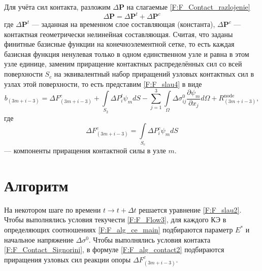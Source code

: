 \documentclass[]{article}
\begin{document}
Для учёта сил контакта, разложим $\Delta\mathbf{P}$ на слагаемые \eqref{F:F_Contact_razlojenie}
\begin{equation}
\Delta\mathbf{P}=\Delta\mathbf{P}^{t}+\Delta\mathbf{P}^{c}
\label{F:F_alg_contact1}
\end{equation}
где $\Delta\mathbf{P}^{t}$ --- заданная на временном слое составляющая (константа), $\Delta \mathbf{P}^{c}$ --- контактная геометрически нелинейная составляющая. Считая, что заданы финитные базисные функции на конечноэлементной сетке, то есть каждая базисная функция ненулевая только в одном единственном узле и равна в этом узле единице, заменим приращение контактных распределённых сил со всей поверхности $S_c$ на эквивалентный набор приращений узловых контактных сил в узлах этой поверхности, то есть представим \eqref{F:F_slau4} в виде
\begin{equation}
b_{(3m+i-3)}=\Delta F_{(3m+i-3)}^{c}+\int\limits_{S_{2}}\Delta P_{i}^{t}\psi_{m} dS - \sum_{j=1}^{3}\int\limits_{\Omega}\Delta\sigma_{ij}^{0}\frac{\partial\psi_{m}}{\partial x_j}d\Omega+R_{(3m+i-3)}^{\mathrm{node}},
\label{F:F_alg_contact2}
\end{equation}
где
\begin{equation}
\Delta F_{(3m+i-3)}^{c}=\int\limits_{S_{c}}\Delta P_{i}^{c}\psi_{m} dS
\label{F:F_alg_contact3}
\end{equation}
--- компоненты приращения контактной силы в узле $m$.

\section{Алгоритм}
На некотором шаге по времени $t\longrightarrow t+\Delta t$ решается уравнение \eqref{F:F_slau2}. Чтобы выполнялись условия текучести \eqref{F:F_Flow3}, для каждого КЭ в определяющих соотношениях \eqref{F:F_alg_ce_main} подбираются параметр $E^*$ и начальное напряжение $\Delta\sigma^{0}$. Чтобы выполнялись условия контакта \eqref{F:F_Contact_Signorini}, в формуле \eqref{F:F_alg_contact2} подбираются приращения узловых сил реакции опоры $\Delta F_{(3m+i-3)}^{c}$.
\end{document}
